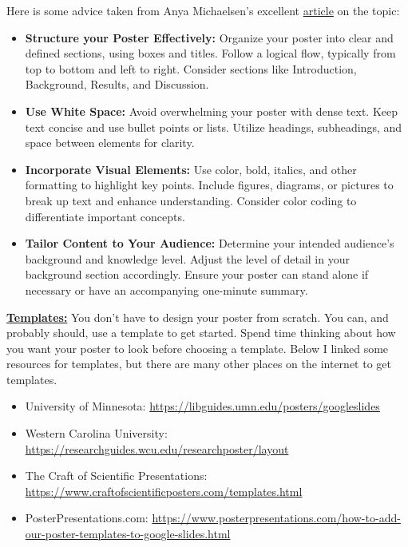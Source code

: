 \documentclass[12pt]{article}
\begin{document}
Here is some advice taken from Anya Michaelsen's excellent \href{https://www.ams.org/journals/notices/202002/rnoti-p189.pdf}{article} on the topic:
\begin{itemize}
    \item \textbf{Structure your Poster Effectively:} Organize your poster into clear and defined sections, using boxes and titles. Follow a logical flow, typically from top to bottom and left to right. Consider sections like Introduction, Background, Results, and Discussion.

    \item \textbf{Use White Space:} Avoid overwhelming your poster with dense text. Keep text concise and use bullet points or lists. Utilize headings, subheadings, and space between elements for clarity.

    \item \textbf{Incorporate Visual Elements:} Use color, bold, italics, and other formatting to highlight key points. Include figures, diagrams, or pictures to break up text and enhance understanding. Consider color coding to differentiate important concepts.

    \item \textbf{Tailor Content to Your Audience:} Determine your intended audience's background and knowledge level. Adjust the level of detail in your background section accordingly. Ensure your poster can stand alone if necessary or have an accompanying one-minute summary.
\end{itemize}


\underline{\textbf{Templates:}} You don't have to design your poster from scratch. You can, and probably should, use a template to get started. Spend time thinking about how you want your poster to look before choosing a template. Below I linked some resources for templates, but there are many other places on the internet to get templates.
\begin{itemize}
    \item University of Minnesota: \url{https://libguides.umn.edu/posters/googleslides}
    \item Western Carolina University: \url{https://researchguides.wcu.edu/researchposter/layout}
    \item The Craft of Scientific Presentations: \url{https://www.craftofscientificposters.com/templates.html}
    \item PosterPresentations.com: \url{https://www.posterpresentations.com/how-to-add-our-poster-templates-to-google-slides.html}
\end{itemize}
\end{document}
